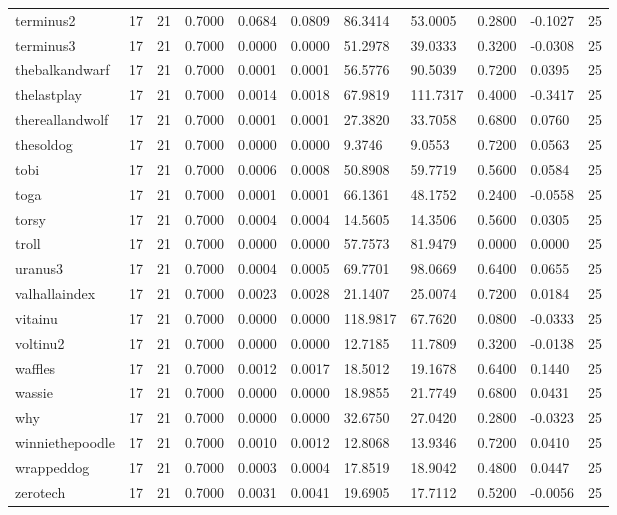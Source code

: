 \begin{table}[htbp]
\begin{tabular}{lllllllllll}
terminus2 & 17 & 21 & 0.7000 & 0.0684 & 0.0809 & 86.3414 & 53.0005 & 0.2800 & -0.1027 & 25 \\
terminus3 & 17 & 21 & 0.7000 & 0.0000 & 0.0000 & 51.2978 & 39.0333 & 0.3200 & -0.0308 & 25 \\
thebalkandwarf & 17 & 21 & 0.7000 & 0.0001 & 0.0001 & 56.5776 & 90.5039 & 0.7200 & 0.0395 & 25 \\
thelastplay & 17 & 21 & 0.7000 & 0.0014 & 0.0018 & 67.9819 & 111.7317 & 0.4000 & -0.3417 & 25 \\
thereallandwolf & 17 & 21 & 0.7000 & 0.0001 & 0.0001 & 27.3820 & 33.7058 & 0.6800 & 0.0760 & 25 \\
thesoldog & 17 & 21 & 0.7000 & 0.0000 & 0.0000 & 9.3746 & 9.0553 & 0.7200 & 0.0563 & 25 \\
tobi & 17 & 21 & 0.7000 & 0.0006 & 0.0008 & 50.8908 & 59.7719 & 0.5600 & 0.0584 & 25 \\
toga & 17 & 21 & 0.7000 & 0.0001 & 0.0001 & 66.1361 & 48.1752 & 0.2400 & -0.0558 & 25 \\
torsy & 17 & 21 & 0.7000 & 0.0004 & 0.0004 & 14.5605 & 14.3506 & 0.5600 & 0.0305 & 25 \\
troll & 17 & 21 & 0.7000 & 0.0000 & 0.0000 & 57.7573 & 81.9479 & 0.0000 & 0.0000 & 25 \\
uranus3 & 17 & 21 & 0.7000 & 0.0004 & 0.0005 & 69.7701 & 98.0669 & 0.6400 & 0.0655 & 25 \\
valhallaindex & 17 & 21 & 0.7000 & 0.0023 & 0.0028 & 21.1407 & 25.0074 & 0.7200 & 0.0184 & 25 \\
vitainu & 17 & 21 & 0.7000 & 0.0000 & 0.0000 & 118.9817 & 67.7620 & 0.0800 & -0.0333 & 25 \\
voltinu2 & 17 & 21 & 0.7000 & 0.0000 & 0.0000 & 12.7185 & 11.7809 & 0.3200 & -0.0138 & 25 \\
waffles & 17 & 21 & 0.7000 & 0.0012 & 0.0017 & 18.5012 & 19.1678 & 0.6400 & 0.1440 & 25 \\
wassie & 17 & 21 & 0.7000 & 0.0000 & 0.0000 & 18.9855 & 21.7749 & 0.6800 & 0.0431 & 25 \\
why & 17 & 21 & 0.7000 & 0.0000 & 0.0000 & 32.6750 & 27.0420 & 0.2800 & -0.0323 & 25 \\
winniethepoodle & 17 & 21 & 0.7000 & 0.0010 & 0.0012 & 12.8068 & 13.9346 & 0.7200 & 0.0410 & 25 \\
wrappeddog & 17 & 21 & 0.7000 & 0.0003 & 0.0004 & 17.8519 & 18.9042 & 0.4800 & 0.0447 & 25 \\
zerotech & 17 & 21 & 0.7000 & 0.0031 & 0.0041 & 19.6905 & 17.7112 & 0.5200 & -0.0056 & 25 \\

\end{tabular}
\end{table}
